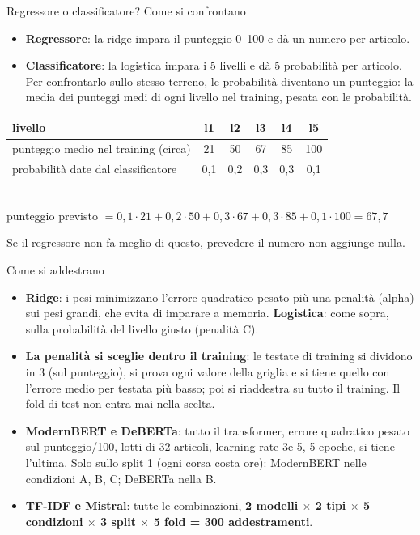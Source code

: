 \documentclass[aspectratio=169]{beamer}
\newcommand{\hl}[1]{\textbf{#1}}
\begin{document}
\begin{frame}{Regressore o classificatore? Come si confrontano}
  \vfill
  \begin{itemize}
    \setlength\itemsep{0.8em}
    \item \hl{Regressore}: la ridge impara il punteggio 0--100 e d\`a un numero per articolo.
    \item \hl{Classificatore}: la logistica impara i 5 livelli e d\`a 5 probabilit\`a per articolo. Per confrontarlo sullo
          stesso terreno, le probabilit\`a diventano un punteggio: la media dei punteggi medi di ogni livello nel training,
          pesata con le probabilit\`a.
  \end{itemize}
  \vspace{0.6em}
  \centering\small
  \begin{tabular}{lccccc}
    \toprule
    livello & l1 & l2 & l3 & l4 & l5 \\
    \midrule
    punteggio medio nel training (circa) & 21 & 50 & 67 & 85 & 100 \\
    probabilit\`a date dal classificatore & 0,1 & 0,2 & 0,3 & 0,3 & 0,1 \\
    \bottomrule
  \end{tabular}\\[0.5em]
  punteggio previsto $= 0{,}1\cdot21 + 0{,}2\cdot50 + 0{,}3\cdot67 + 0{,}3\cdot85 + 0{,}1\cdot100 = 67{,}7$\\[0.8em]
  \raggedright
  Se il regressore non fa meglio di questo, prevedere il numero non aggiunge nulla.
  \vfill
\end{frame}

\begin{frame}{Come si addestrano}
  \vfill
  \small
  \begin{itemize}
    \setlength\itemsep{0.7em}
    \item \hl{Ridge}: i pesi minimizzano l'errore quadratico pesato pi\`u una penalit\`a (alpha) sui pesi grandi, che evita di
          imparare a memoria. \hl{Logistica}: come sopra, sulla probabilit\`a del livello giusto (penalit\`a C).
    \item \hl{La penalit\`a si sceglie dentro il training}: le testate di training si dividono in 3 (sul punteggio), si prova
          ogni valore della griglia e si tiene quello con l'errore medio per testata pi\`u basso; poi si riaddestra su tutto il
          training. Il fold di test non entra mai nella scelta.
    \item \hl{ModernBERT e DeBERTa}: tutto il transformer, errore quadratico pesato sul punteggio/100, lotti di 32 articoli,
          learning rate 3e-5, 5 epoche, si tiene l'ultima. Solo sullo split 1 (ogni corsa costa ore): ModernBERT nelle
          condizioni A, B, C; DeBERTa nella B.
    \item \hl{TF-IDF e Mistral}: tutte le combinazioni, \hl{2 modelli $\times$ 2 tipi $\times$ 5 condizioni $\times$ 3 split
          $\times$ 5 fold = 300 addestramenti}.
  \end{itemize}
  \vfill
\end{frame}
\end{document}
